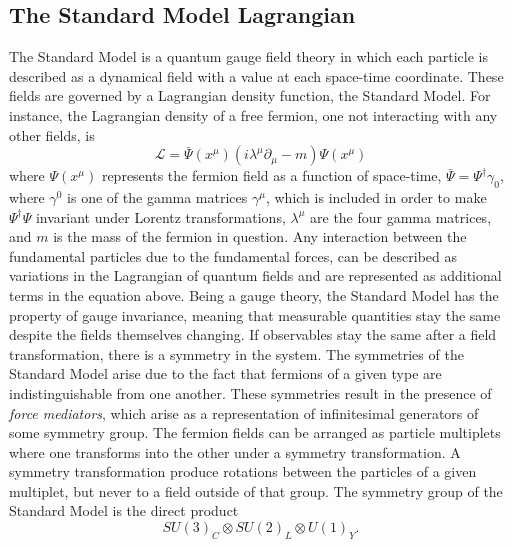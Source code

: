 \subsection{The Standard Model Lagrangian}
\label{sec:theory:gauge}
The Standard Model is a quantum gauge field theory in which each particle is described as a dynamical field with a value at each space-time coordinate. These fields are governed by a Lagrangian density function, the Standard Model. For instance, the Lagrangian density of a free fermion, one not interacting with any other fields, is
\begin{equation}
  \mathcal{L} = \bar{\Psi}(x^{\mu})(i\lambda^{\mu}\partial_{\mu}-m)\Psi(x^{\mu})
\end{equation}
where $\Psi(x^{\mu})$ represents the fermion field as a function of space-time, $\bar{\Psi}=\Psi^{\dagger}\gamma_0$, where $\gamma^0$ is one of the gamma matrices $\gamma^{\mu}$, which is included in order to make $\Psi^{\dagger}\Psi$ invariant under Lorentz transformations, $\lambda^{\mu}$ are the four gamma matrices, and $m$ is the mass of the fermion in question. Any interaction between the fundamental particles due to the fundamental forces, can be described as variations in the Lagrangian of quantum fields and are represented as additional terms in the equation above.\newline
Being a gauge theory, the Standard Model has the property of gauge invariance, meaning that measurable quantities stay the same despite the fields themselves changing. If observables stay the same after a field transformation, there is a symmetry in the system. The symmetries of the Standard Model arise due to the fact that fermions of a given type are indistinguishable from one another. These symmetries result in the presence of \emph{force mediators}, which arise as a representation of infinitesimal generators of some symmetry group.
The fermion fields can be arranged as particle multiplets where one transforms into the other under a symmetry transformation. A symmetry transformation produce rotations between the particles of a given multiplet, but never to a field outside of that group. The symmetry group of the Standard Model is the direct product
\begin{equation}
  SU(3)_C \otimes SU (2)_L \otimes U(1)_Y.
\end{equation}
